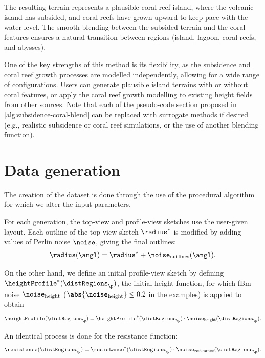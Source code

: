 The resulting terrain represents a plausible coral reef island, where the volcanic island has subsided, and coral reefs have grown upward to keep pace with the water level. The smooth blending between the subsided terrain and the coral features ensures a natural transition between regions (island, lagoon, coral reefs, and abysses).

One of the key strengths of this method is its flexibility, as the subsidence and coral reef growth processes are modelled independently, allowing for a wide range of configurations. Users can generate plausible island terrains with or without coral features, or apply the coral reef growth modelling to existing height fields from other sources. Note that each of the pseudo-code section proposed in \cref{alg:subsidence-coral-blend} can be replaced with surrogate methods if desired (e.g., realistic subsidence or coral reef simulations, or the use of another blending function).


\section{Data generation}
\label{sec:coral-island-dataset-generation}

The creation of the dataset is done through the use of the procedural algorithm for which we alter the input parameters.

For each generation, the top-view and profile-view sketches use the user-given layout. Each outline of the top-view sketch $\radius^*$ is modified by adding values of Perlin noise $\noise$, giving the final outlines:
\begin{align*}
    \radius(\angl) = \radius^* + \noise_{\text{outlines}}(\angl).
\end{align*}

On the other hand, we define an initial profile-view sketch by defining $\heightProfile^*(\distRegions_\p)$, the initial height function, for which fBm noise $\noise_{\text{height}}$ ($\abs{\noise_{\text{height}}} \leq 0.2$ in the examples) is applied to obtain
\begin{align*}
    \heightProfile(\distRegions_\p) = \heightProfile^*(\distRegions_\p) \cdot \noise_{\text{height}}(\distRegions_\p).
\end{align*}

An identical process is done for the resistance function:
\begin{align*}
    \resistance(\distRegions_\p) = \resistance^*(\distRegions_\p) \cdot \noise_{\text{resistance}}(\distRegions_\p).
\end{align*}

